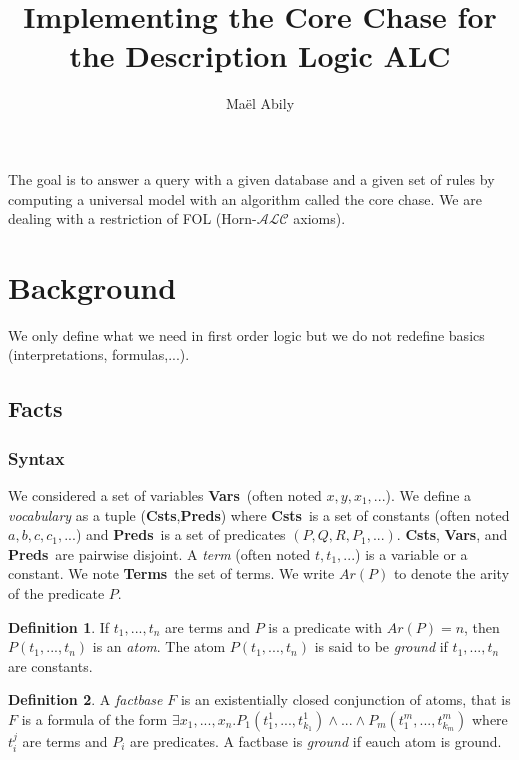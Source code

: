 \documentclass{article}
\title{Implementing the Core Chase for the Description Logic ALC}
\author{Maël Abily}
\theoremstyle{definition}
\newtheorem{definition}{Definition}[section]
\theoremstyle{remark}
\newcommand{\Vars}{\textbf{Vars}}
\newcommand{\Terms}{\textbf{Terms}}
\newcommand{\Preds}{\textbf{Preds}}
\newcommand{\Csts}{\textbf{Csts}}
\begin{document}
\maketitle						%





The goal is to answer a query with a given database and a given set of rules by computing a universal model with an algorithm called the core chase. We are dealing with a restriction of FOL (Horn-$\mathcal{ALC}$ axioms).

\tableofcontents					%
\section{Background}

We only define what we need in first order logic but we do not redefine basics (interpretations, formulas,...).

\subsection{Facts}

\subsubsection{Syntax}

We considered a set of variables \Vars\ (often noted $x,y,x_{1},...$). We define a \emph{vocabulary} as a tuple (\Csts,\Preds) where \Csts\ is a set of constants (often noted $a,b,c,c_{1},...$) and \Preds\ is a set of predicates $(P,Q,R,P_{1},...)$. \Csts, \Vars, and \Preds\ are pairwise disjoint. A \emph{term}  (often noted $t,t_{1},...$) is a variable or a constant. We note \Terms\ the set of terms. We write \emph{$\textit{Ar}(P)$} to denote the arity of the predicate $P$. 

\begin{definition}
If $t_1,...,t_n$ are terms and $P$ is a predicate with $Ar(P) = n$, then $P(t_{1},...,t_{n})$ is an \emph{atom}. The atom $P(t_{1},...,t_{n})$ is said to be \emph{ground} if $t_1,...,t_n$ are constants. 
\end{definition}

\begin{definition}
A \emph{factbase} $F$ is an existentially closed conjunction of atoms, that is $F$ is a formula of the form $\exists x_{1},...,x_{n}.P_{1}(t_{1}^{1},...,t_{k_{1}}^{1})\land ...\land P_{m}(t_{1}^{m},...,t_{k_{m}}^{m})$ where $t_i^j$ are terms and $P_i$ are predicates. A factbase is \emph{ground} if eauch atom is ground. 
\end{definition}
\end{document}
